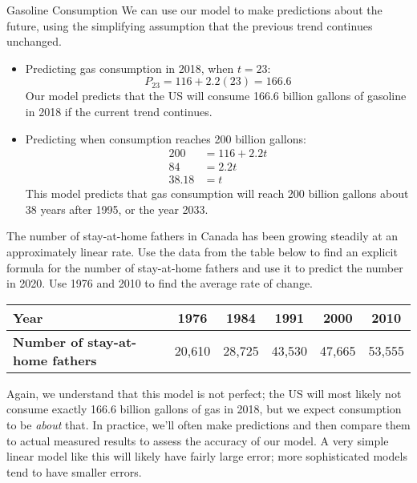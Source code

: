 \begin{example}[https://www.youtube.com/watch?v=QoOdfeLBN0o]{Gasoline Consumption}
We can use our model to make predictions about the future, using the simplifying assumption that the previous trend continues unchanged.
\begin{itemize}
\item Predicting gas consumption in 2018, when $t=23$:
\[P_{23} = 116 + 2.2(23) = \boxed{166.6}\]
Our model predicts that the US will consume 166.6 billion gallons of gasoline in 2018 if the current trend continues.

\item Predicting when consumption reaches 200 billion gallons:
\begin{align*}
200 &= 116 + 2.2t\\
84 &= 2.2t\\
\boxed{38.18} &= t
\end{align*}
This model predicts that gas consumption will reach 200 billion gallons about 38 years after 1995, or the year 2033.
\end{itemize}
\end{example}

\begin{try}
The number of stay-at-home fathers in Canada has been growing steadily at an approximately linear rate.  Use the data from the table below to find an explicit formula for the number of stay-at-home fathers and use it to predict the number in 2020.  Use 1976 and 2010 to find the average rate of change.
\begin{center}
\begin{tabular}{|p{1.25in} | c | c | c | c | c|}
\hline
\textbf{Year} & 1976 & 1984 & 1991 & 2000 & 2010\\
\hline
\textbf{Number of stay-at-home fathers} & 20,610 & 28,725 & 43,530 & 47,665 & 53,555\\
\hline
\end{tabular}
\end{center}
\end{try}

Again, we understand that this model is not perfect; the US will most likely not consume exactly 166.6 billion gallons of gas in 2018, but we expect consumption to be \textit{about} that.  In practice, we'll often make predictions and then compare them to actual measured results to assess the accuracy of our model.  A very simple linear model like this will likely have fairly large error; more sophisticated models tend to have smaller errors.

